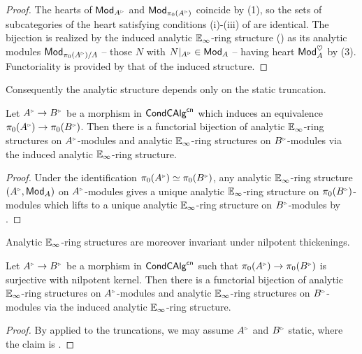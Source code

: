 \begin{proof}
    The hearts of $\Mod_{A^{\tri}}$ and $\Mod_{\pi_{0}(A^{\tri})}$ coincide by  (1), so the sets of subcategories of the heart satisfying conditions (i)-(iii) of  are identical. The bijection is realized by the induced analytic $\mathbb{E}_{\infty}$-ring structure () as its analytic modules $\Mod_{\pi_{0}(A^{\tri})/A}$ -- those $N$ with $N|_{A^{\tri}}\in\Mod_{A}$ -- having heart $\mathsf{Mod}_{A}^{\heartsuit}$ by  (3). Functoriality is provided by that of the induced structure. 
\end{proof}
Consequently the analytic structure depends only on the static truncation. 
\begin{corollary}\label{cor: induced for equivalence on pi0}
    Let $A^{\tri}\to B^{\tri}$ be a morphism in $\mathsf{Cond}\mathsf{CAlg}^{\mathsf{cn}}$ which induces an equivalence $\pi_{0}(A^{\tri})\to\pi_{0}(B^{\tri})$. Then there is a functorial bijection of analytic $\mathbb{E}_{\infty}$-ring structures on $A^{\tri}$-modules and analytic $\mathbb{E}_{\infty}$-ring structures on $B^{\tri}$-modules via the induced analytic $\mathbb{E}_{\infty}$-ring structure. 
\end{corollary}
\begin{proof}
    Under the identification $\pi_{0}(A^{\tri})\simeq\pi_{0}(B^{\tri})$, any analytic $\mathbb{E}_{\infty}$-ring structure $(A^{\tri},\Mod_{A})$ on $A^{\tri}$-modules gives a unique analytic $\mathbb{E}_{\infty}$-ring structure on $\pi_{0}(B^{\tri})$-modules which lifts to a unique analytic $\mathbb{E}_{\infty}$-ring structure on $B^{\tri}$-modules by . 
\end{proof}
Analytic $\mathbb{E}_{\infty}$-ring structures are moreover invariant under nilpotent thickenings. 
\begin{corollary}\label{cor: analytic structures invariant under nilpotent thickenings}
    Let $A^{\tri}\to B^{\tri}$ be a morphism in $\mathsf{Cond}\mathsf{CAlg}^{\mathsf{cn}}$ such that $\pi_{0}(A^{\tri})\to\pi_{0}(B^{\tri})$ is surjective with nilpotent kernel. Then there is a functorial bijection of analytic $\mathbb{E}_{\infty}$-ring structures on $A^{\tri}$-modules and analytic $\mathbb{E}_{\infty}$-ring structures on $B^{\tri}$-modules via the induced analytic $\mathbb{E}_{\infty}$-ring structure. 
\end{corollary}
\begin{proof}
    By  applied to the truncations, we may assume $A^{\tri}$ and $B^{\tri}$ static, where the claim is \cite[Prop. 4.4.5]{CamargoSolid}. 
\end{proof}
